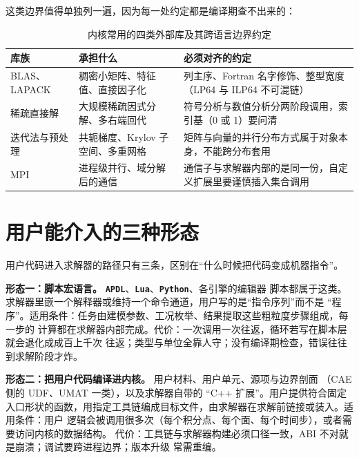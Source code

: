 \documentclass[12pt,a4paper,fontset=fandol]{ctexbook}
\newcommand{\Lib}[1]{\textbf{\texttt{#1}}}
\newcommand{\Lang}[1]{\textsf{#1}}
\newcommand{\DomCAE}{\Lang{CAE}}
\begin{document}
这类边界值得单独列一遍，因为每一处约定都是编译期查不出来的：

\begin{table}[htbp]
\centering
\caption{内核常用的四类外部库及其跨语言边界约定}
\label{tab:ch01-abi}
\begin{tabular}{>{\raggedright\arraybackslash}p{}
                >{\raggedright\arraybackslash}p{}
                >{\raggedright\arraybackslash}p{}}
\toprule
\textbf{库族} & \textbf{承担什么} & \textbf{必须对齐的约定} \\
\midrule
BLAS、LAPACK & 稠密小矩阵、特征值、直接因子化 & 列主序、Fortran 名字修饰、整型宽度（LP64 与 ILP64 不可混链） \\
稀疏直接解 & 大规模稀疏因式分解、多右端回代 & 符号分析与数值分析分两阶段调用，索引基（0 或 1）要问清 \\
迭代法与预处理 & 共轭梯度、Krylov 子空间、多重网格 & 矩阵与向量的并行分布方式属于对象本身，不能跨分布套用 \\
MPI & 进程级并行、域分解后的通信 & 通信子与求解器内部的是同一份，自定义扩展里要谨慎插入集合调用 \\
\bottomrule
\end{tabular}
\end{table}

\section{用户能介入的三种形态}
\label{sec:ch01-three-forms}

用户代码进入求解器的路径只有三条，区别在``什么时候把代码变成机器指令''。

\textbf{形态一：脚本宏语言。} \Lib{APDL}、\Lib{Lua}、\Lib{Python}、各引擎的编辑器
脚本都属于这类。求解器里嵌一个解释器或维持一个命令通道，用户写的是``指令序列''而不是
``程序''。适用条件：任务由建模参数、工况枚举、结果提取这些粗粒度步骤组成，每一步的
计算都在求解器内部完成。代价：一次调用一次往返，循环若写在脚本层就会退化成成百上千次
往返；类型与单位全靠人守；没有编译期检查，错误往往到求解阶段才炸。

\textbf{形态二：把用户代码编译进内核。} 用户材料、用户单元、源项与边界剖面
（\DomCAE{} 侧的 UDF、UMAT 一类），以及求解器自带的 ``C++ 扩展''。用户提供符合固定
入口形状的函数，用指定工具链编成目标文件，由求解器在求解前链接或装入。适用条件：用户
逻辑会被调用很多次（每个积分点、每个面、每个时间步），或者需要访问内核的数据结构。
代价：工具链与求解器构建必须口径一致，ABI 不对就是崩溃；调试要跨进程边界；版本升级
常需重编。
\end{document}
